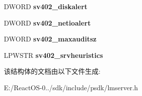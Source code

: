 \begin{DoxyCompactItemize}
D\+W\+O\+RD {\bfseries sv402\+\_\+diskalert}
\item 
\mbox{\label{struct___s_e_r_v_e_r___i_n_f_o__402_a95fba80635c39cd99ec9c14af4f3ae81}} 
D\+W\+O\+RD {\bfseries sv402\+\_\+netioalert}
\item 
\mbox{\label{struct___s_e_r_v_e_r___i_n_f_o__402_a7a23bc10aa4fac2a8e17d0b8a8eb12f5}} 
D\+W\+O\+RD {\bfseries sv402\+\_\+maxauditsz}
\item 
\mbox{\label{struct___s_e_r_v_e_r___i_n_f_o__402_ad6673218f8852baa9d44512679d16a7d}} 
L\+P\+W\+S\+TR {\bfseries sv402\+\_\+srvheuristics}
\end{DoxyCompactItemize}


该结构体的文档由以下文件生成\+:\begin{DoxyCompactItemize}
\item 
E\+:/\+React\+O\+S-\/0../sdk/include/psdk/lmserver.\+h\end{DoxyCompactItemize}
